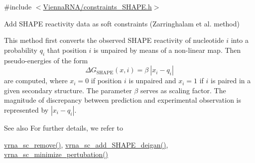 {\ttfamily \#include $<$\mbox{\hyperlink{constraints___s_h_a_p_e_8h}{Vienna\+R\+N\+A/constraints\+\_\+\+S\+H\+A\+P\+E.\+h}}$>$}



Add S\+H\+A\+PE reactivity data as soft constraints (Zarringhalam et al. method) 

This method first converts the observed S\+H\+A\+PE reactivity of nucleotide $ i $ into a probability $ q_i $ that position $ i $ is unpaired by means of a non-\/linear map. Then pseudo-\/energies of the form \[ \Delta G_{\text{SHAPE}}(x,i) = \beta\ |x_i - q_i| \] are computed, where $ x_i=0 $ if position $ i $ is unpaired and $ x_i=1 $ if $ i $ is paired in a given secondary structure. The parameter $ \beta $ serves as scaling factor. The magnitude of discrepancy between prediction and experimental observation is represented by $ |x_i - q_i| $.

\begin{DoxySeeAlso}{See also}
For further details, we refer to \cite{zarringhalam:2012} 

\mbox{\hyperlink{group__soft__constraints_ga73cdc07b9a199c614367bebef0f2c41a}{vrna\+\_\+sc\+\_\+remove()}}, \mbox{\hyperlink{group___s_h_a_p_e__reactivities_ga57d612b58e1c61dd6cfcb5a843f8f1b3}{vrna\+\_\+sc\+\_\+add\+\_\+\+S\+H\+A\+P\+E\+\_\+deigan()}}, \mbox{\hyperlink{group__perturbation_gaa124bdc20d88001c38ade590c4bcc3c4}{vrna\+\_\+sc\+\_\+minimize\+\_\+pertubation()}}
\end{DoxySeeAlso}

